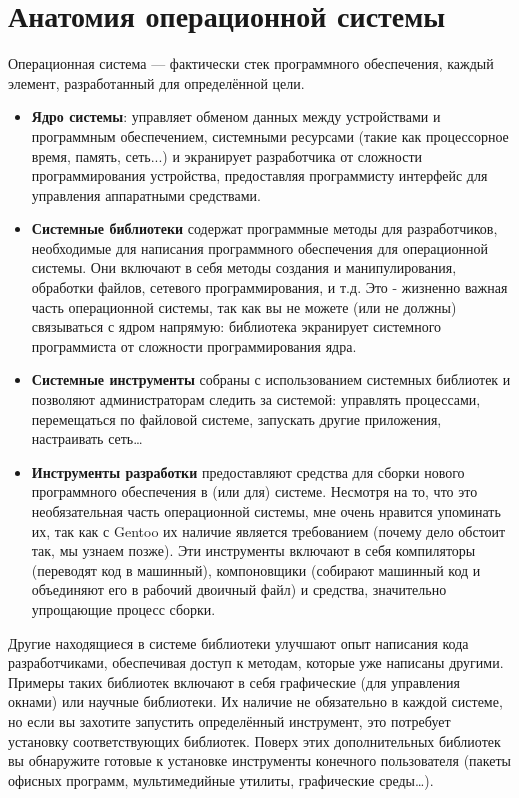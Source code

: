 \documentclass[12pt]{book}
\begin{document}
\newpage

\pagestyle{headings}
\chapter{Анатомия операционной системы}

Операционная система --- фактически стек программного обеспечения, каждый элемент, разработанный для определённой цели.

\begin{itemize}
	\item \textbf{Ядро системы}: управляет обменом данных между устройствами и программным обеспечением, системными ресурсами (такие как процессорное время, память, сеть...) и экранирует разработчика от сложности программирования устройства, предоставляя программисту интерфейс для управления аппаратными средствами.
	\item \textbf{Системные библиотеки} содержат программные методы для разработчиков, необходимые для написания программного обеспечения для операционной системы. Они включают в себя методы создания и манипулирования, обработки файлов, сетевого программирования, и т.д. Это - жизненно важная часть операционной системы, так как вы не можете (или не  должны) связываться с ядром напрямую: библиотека экранирует системного программиста от сложности программирования ядра.
	\item \textbf{Системные инструменты} собраны с использованием системных библиотек и позволяют администраторам следить за системой: управлять процессами, перемещаться по файловой системе, запускать другие приложения, настраивать сеть\ldots
	\item \textbf{Инструменты разработки} предоставляют средства для сборки нового программного обеспечения в (или для) системе. Несмотря на то, что это необязательная часть операционной системы, мне очень нравится упоминать их, так как с Gentoo их наличие является требованием (почему дело обстоит так, мы узнаем позже). Эти инструменты включают в себя компиляторы (переводят код в машинный), компоновщики (собирают машинный код и объединяют его в рабочий двоичный файл) и средства, значительно упрощающие процесс сборки.
\end{itemize}

Другие находящиеся в системе библиотеки улучшают опыт написания кода разработчиками, обеспечивая доступ к методам, которые уже написаны другими. Примеры таких библиотек включают в себя графические (для управления окнами) или научные библиотеки. Их наличие не обязательно в каждой системе, но если вы захотите запустить определённый инструмент, это потребует установку соответствующих библиотек. Поверх этих дополнительных библиотек вы обнаружите готовые к установке инструменты конечного пользователя (пакеты офисных программ, мультимедийные утилиты, графические среды\ldots).
\end{document}
